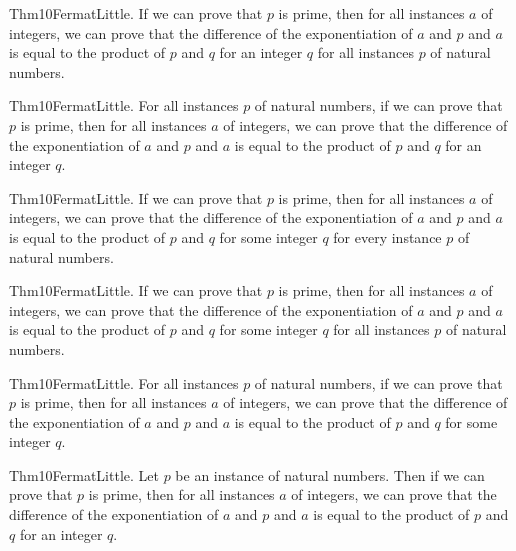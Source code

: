 \documentclass{article}
\begin{document}
Thm10FermatLittle. If we can prove that $p$ is prime, then for all instances $a$ of integers, we can prove that the difference of the exponentiation of $a$ and $p$ and $a$ is equal to the product of $p$ and $q$ for an integer $q$ for all instances $p$ of natural numbers.

Thm10FermatLittle. For all instances $p$ of natural numbers, if we can prove that $p$ is prime, then for all instances $a$ of integers, we can prove that the difference of the exponentiation of $a$ and $p$ and $a$ is equal to the product of $p$ and $q$ for an integer $q$.

Thm10FermatLittle. If we can prove that $p$ is prime, then for all instances $a$ of integers, we can prove that the difference of the exponentiation of $a$ and $p$ and $a$ is equal to the product of $p$ and $q$ for some integer $q$ for every instance $p$ of natural numbers.

Thm10FermatLittle. If we can prove that $p$ is prime, then for all instances $a$ of integers, we can prove that the difference of the exponentiation of $a$ and $p$ and $a$ is equal to the product of $p$ and $q$ for some integer $q$ for all instances $p$ of natural numbers.

Thm10FermatLittle. For all instances $p$ of natural numbers, if we can prove that $p$ is prime, then for all instances $a$ of integers, we can prove that the difference of the exponentiation of $a$ and $p$ and $a$ is equal to the product of $p$ and $q$ for some integer $q$.

Thm10FermatLittle. Let $p$ be an instance of natural numbers. Then if we can prove that $p$ is prime, then for all instances $a$ of integers, we can prove that the difference of the exponentiation of $a$ and $p$ and $a$ is equal to the product of $p$ and $q$ for an integer $q$.
\end{document}
